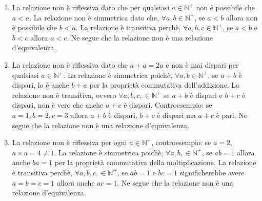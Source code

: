 \begin{soluzione}
    	\begin{enumerate}\setlength\itemsep{1em}
		\item La relazione non è riflessiva dato che per qualsiasi $a \in \mathbb{N}^{+}$ non è possibile che $a < a$. La relazione non è simmetrica dato che, $\forall a,b \in \mathbb{N}^{+}$, se $a < b$ allora non è possibile che $b < a$. La relazione è transitiva perchè, $\forall a,b,c \in \mathbb{N}^{+}$, se $a < b$ e $b < c$ allora $a < c$. Ne segue che la relazione non è una relazione d'equivalenza. 
		
		\item La relazione non è riflessiva dato che $a+a = 2a$ e non è mai dispari per qualsiasi $a \in \mathbb{N}^+$. La relazione è simmetrica poichè, $\forall a,b \in \mathbb{N}^{+}$, se $a+b$ è dispari, lo è anche $b+a$ per la proprietà commutativa dell'addizione. La relazione non è transitiva, ovvero $\forall a,b,c, \in \mathbb{N}^{+}$ se $a+b$ è dispari e $b+c$ è dispari, non è vero che anche $a+c$ è dispari.
		Controesempio: se $a=1, b=2, c=3$ allora $a+b$ è dispari, $b+c$ è dispari ma $a+c$ è pari. Ne segue che la relazione non è una relazione d'equivalenza. 
		
		\item La relazione non è riflessiva per ogni $a \in \mathbb{N}^+$, controesempio: se $a = 2$, $a \times a = 4 \neq 1$. La relazione è simmetrica poichè, $\forall a,b, \in \mathbb{N}^{+}$, se $ab = 1$ allora anche $ba = 1$ per la proprietà commutativa della moltiplicazione. La relazione è transitiva perchè, $\forall a,b,c, \in \mathbb{N}^{+}$, se $ab = 1$ e $bc = 1$ significherebbe avere $a = b = c = 1$ allora anche $ac = 1$. Ne segue che la relazione non è una relazione d'equivalenza. 
	\end{enumerate}

\end{soluzione}




